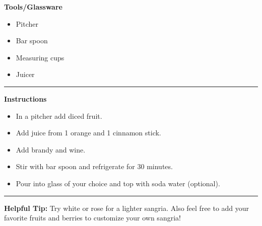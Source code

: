 \hspace{.01\textwidth}\vrule\hspace{.01\textwidth}
\begin{minipage}[t]{.48\textwidth}
    \noindent
    \textbf{\large Tools/Glassware}
    \begin{itemize}
        \item Pitcher
        \item Bar spoon
        \item Measuring cups
        \item Juicer
    \end{itemize}
\end{minipage}
\vspace{.5em}\hrule\vspace{.5em}
\noindent
\begin{minipage}{\textwidth}
    \noindent
    \textbf{\large Instructions}
    \begin{itemize}
        \item In a pitcher add diced fruit.
        \item Add juice from 1 orange and 1 cinnamon stick.
        \item Add brandy and wine.
        \item Stir with bar spoon and refrigerate for 30 minutes.
        \item Pour into glass of your choice and top with soda water (optional).
    \end{itemize}
\end{minipage}
\vspace{.5em}\hrule\vspace{.5em}
\noindent
\textbf{\large Helpful Tip:} Try white or rose for a lighter sangria. Also feel free to add your favorite fruits and berries to customize your own sangria!
\newpage
